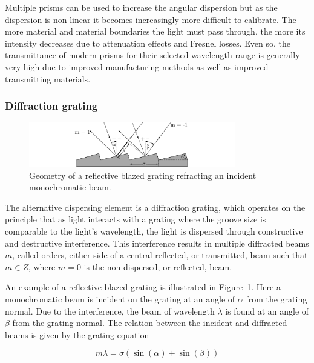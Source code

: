 Multiple prisms can be used to increase the angular dispersion but as the dispersion is non-linear it becomes increasingly more difficult to calibrate. The more material and material boundaries the light must pass through, the more its intensity decreases due to attenuation effects and Fresnel losses. Even so, the transmittance of modern prisms for their selected wavelength range is generally very high\footnotemark{} due to improved manufacturing methods as well as improved transmitting materials.
\enlargethispage{-2\baselineskip}

\subsubsection{Diffraction grating}

\begin{figure}[t]
  \centering
  \includegraphics[width = 9cm]{figures/2_grating_diagram.pdf}
  \caption{Geometry of a reflective blazed grating refracting an incident monochromatic beam.}
  \label{fig:grating_diagram}
\end{figure}

The alternative dispersing element is a diffraction grating, which operates on the principle that as light interacts with a grating where the groove size is comparable to the light's wavelength, the light is dispersed through constructive and destructive interference. This interference results in multiple diffracted beams $m$, called orders, either side of a central reflected, or transmitted, beam such that $m \in Z$, where $m = 0$ is the non-dispersed, or reflected, beam.
\prgph

An example of a reflective blazed grating is illustrated in Figure~\ref{fig:grating_diagram}. Here a monochromatic beam is incident on the grating at an angle of $\alpha$ from the grating normal. Due to the interference, the beam of wavelength $\lambda$ is found at an angle of $\beta$ from the grating normal. The relation between the incident and diffracted beams is given by the grating equation

\begin{equation}
  m\lambda = \sigma (\sin(\alpha) \pm \sin(\beta))
  \label{eq:grating_equation}
\end{equation}

